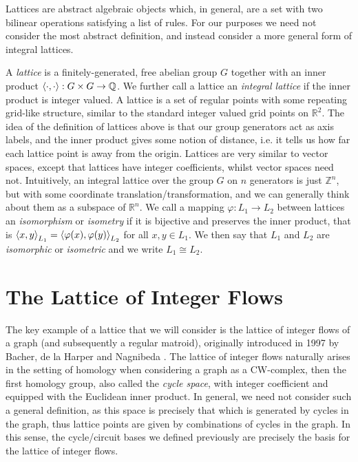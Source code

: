 \documentclass[12pt]{report}
\theoremstyle{definition}
\DeclarePairedDelimiter\iprod{\langle}{\rangle}
\def\Q{\mathbb Q}
\def\R{\mathbb R}
\def\Z{\mathbb Z}
\theoremstyle{upright}
\begin{document}
Lattices are abstract algebraic objects which, in general, are a set with two bilinear operations satisfying a list of rules.
For our purposes we need not consider the most abstract definition, and instead consider a more general form of integral lattices.

A {\em lattice} is a finitely-generated, free abelian group $G$ together with an inner product $\iprod*{\cdot, \cdot}:G\times G\to\Q$.
We further call a lattice an \textit{integral lattice} if the inner product is integer valued.
A lattice is a set of regular points with some repeating grid-like structure, similar to the standard integer valued grid points on $\mathbb{R}^2$.
The idea of the definition of lattices above is that our group generators act as axis labels, and the inner product gives some notion of distance, i.e. it tells us how far each lattice point is away from the origin.
Lattices are very similar to vector spaces, except that lattices have integer coefficients, whilst vector spaces need not.
Intuitively, an integral lattice over the group $G$ on $n$ generators is just $\Z^n$, but with some coordinate translation/transformation, and we can generally think about them as a subspace of $\R^n$.
We call a mapping $\varphi:L_1\to L_2$ between lattices an \textit{isomorphism} or \textit{isometry} if it is bijective and preserves the inner product, that is $\iprod*{x, y}_{L_1}=\iprod*{\varphi(x), \varphi(y)}_{L_2}$ for all $x, y\in L_1$.
We then say that $L_1$ and $L_2$ are \textit{isomorphic} or \textit{isometric} and we write $L_1\cong L_2$.

\section{The Lattice of Integer Flows}
\label{sec:IFL}

The key example of a lattice that we will consider is the lattice of integer flows of a graph (and subsequently a regular matroid), originally introduced in 1997 by Bacher, de la Harper and Nagnibeda \cite{bacher1997lattice}.
The lattice of integer flows naturally arises in the setting of homology when considering a graph as a CW-complex, then the first homology group, also called the \textit{cycle space}, with integer coefficient and equipped with the Euclidean inner product.
In general, we need not consider such a general definition, as this space is precisely that which is generated by cycles in the graph, thus lattice points are given by combinations of cycles in the graph.
In this sense, the cycle/circuit bases we defined previously are precisely the basis for the lattice of integer flows.
\end{document}

